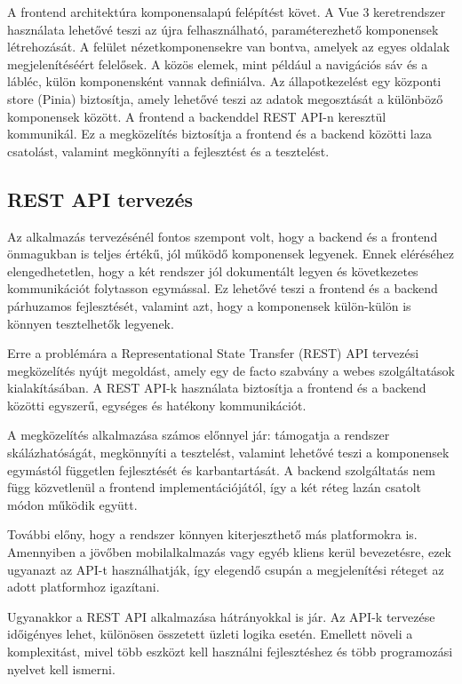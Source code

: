 A frontend architektúra komponensalapú felépítést követ. A Vue 3 keretrendszer használata lehetővé teszi az újra felhasználható, paraméterezhető komponensek létrehozását. A felület nézetkomponensekre van bontva, amelyek az egyes oldalak megjelenítéséért felelősek. A közös elemek, mint például a navigációs sáv és a lábléc, külön komponensként vannak definiálva. Az állapotkezelést egy központi store (Pinia) biztosítja, amely lehetővé teszi az adatok megosztását a különböző komponensek között. A frontend a backenddel REST API-n keresztül kommunikál. Ez a megközelítés biztosítja a frontend és a backend közötti laza csatolást, valamint megkönnyíti a fejlesztést és a tesztelést.

\subsection{REST API tervezés}

Az alkalmazás tervezésénél fontos szempont volt, hogy a backend és a frontend önmagukban is teljes értékű, jól működő komponensek legyenek. Ennek eléréséhez elengedhetetlen, hogy a két rendszer jól dokumentált legyen és következetes kommunikációt folytasson egymással. Ez lehetővé teszi a frontend és a backend párhuzamos fejlesztését, valamint azt, hogy a komponensek külön-külön is könnyen tesztelhetők legyenek.

Erre a problémára a Representational State Transfer (REST) API tervezési megközelítés nyújt megoldást, amely egy de facto szabvány a webes szolgáltatások kialakításában. A REST API-k használata biztosítja a frontend és a backend közötti egyszerű, egységes és hatékony kommunikációt.

A megközelítés alkalmazása számos előnnyel jár: támogatja a rendszer skálázhatóságát, megkönnyíti a tesztelést, valamint lehetővé teszi a komponensek egymástól független fejlesztését és karbantartását. A backend szolgáltatás nem függ közvetlenül a frontend implementációjától, így a két réteg lazán csatolt módon működik együtt.

További előny, hogy a rendszer könnyen kiterjeszthető más platformokra is. Amennyiben a jövőben mobilalkalmazás vagy egyéb kliens kerül bevezetésre, ezek ugyanazt az API-t használhatják, így elegendő csupán a megjelenítési réteget az adott platformhoz igazítani.

Ugyanakkor a REST API alkalmazása hátrányokkal is jár. Az API-k tervezése időigényes lehet, különösen összetett üzleti logika esetén. Emellett növeli a komplexitást, mivel több eszközt kell használni fejlesztéshez és több programozási nyelvet kell ismerni.

